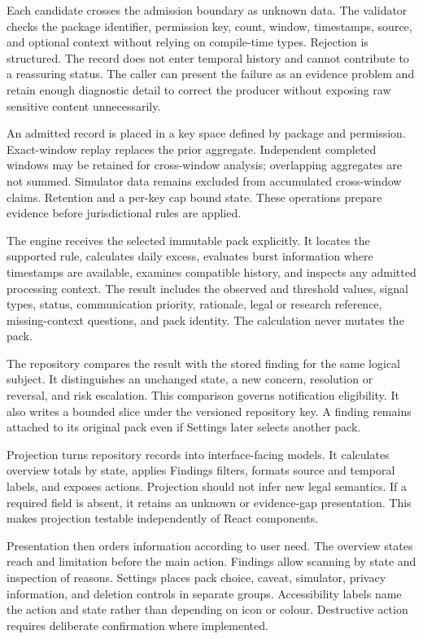 Each candidate crosses the admission boundary as unknown data. The validator checks the package identifier, permission key, count, window, timestamps, source, and optional context without relying on compile-time types. Rejection is structured. The record does not enter temporal history and cannot contribute to a reassuring status. The caller can present the failure as an evidence problem and retain enough diagnostic detail to correct the producer without exposing raw sensitive content unnecessarily.

An admitted record is placed in a key space defined by package and permission. Exact-window replay replaces the prior aggregate. Independent completed windows may be retained for cross-window analysis; overlapping aggregates are not summed. Simulator data remains excluded from accumulated cross-window claims. Retention and a per-key cap bound state. These operations prepare evidence before jurisdictional rules are applied.

The engine receives the selected immutable pack explicitly. It locates the supported rule, calculates daily excess, evaluates burst information where timestamps are available, examines compatible history, and inspects any admitted processing context. The result includes the observed and threshold values, signal types, status, communication priority, rationale, legal or research reference, missing-context questions, and pack identity. The calculation never mutates the pack.

The repository compares the result with the stored finding for the same logical subject. It distinguishes an unchanged state, a new concern, resolution or reversal, and risk escalation. This comparison governs notification eligibility. It also writes a bounded slice under the versioned repository key. A finding remains attached to its original pack even if Settings later selects another pack.

Projection turns repository records into interface-facing models. It calculates overview totals by state, applies Findings filters, formats source and temporal labels, and exposes actions. Projection should not infer new legal semantics. If a required field is absent, it retains an unknown or evidence-gap presentation. This makes projection testable independently of React components.

Presentation then orders information according to user need. The overview states reach and limitation before the main action. Findings allow scanning by state and inspection of reasons. Settings places pack choice, caveat, simulator, privacy information, and deletion controls in separate groups. Accessibility labels name the action and state rather than depending on icon or colour. Destructive action requires deliberate confirmation where implemented.

